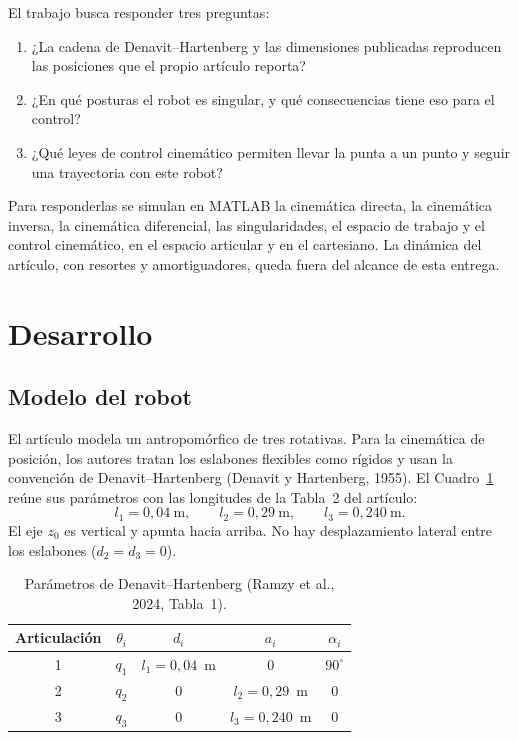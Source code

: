\documentclass[11pt,a4paper]{article}
\begin{document}
El trabajo busca responder tres preguntas:
\begin{enumerate}
\item ¿La cadena de Denavit--Hartenberg y las dimensiones publicadas reproducen las posiciones que el propio artículo reporta?
\item ¿En qué posturas el robot es singular, y qué consecuencias tiene eso para el control?
\item ¿Qué leyes de control cinemático permiten llevar la punta a un punto y seguir una trayectoria con este robot?
\end{enumerate}

Para responderlas se simulan en MATLAB la cinemática directa, la cinemática inversa, la cinemática diferencial, las singularidades, el espacio de trabajo y el control cinemático, en el espacio articular y en el cartesiano. La dinámica del artículo, con resortes y amortiguadores, queda fuera del alcance de esta entrega.

\section{Desarrollo}

\subsection{Modelo del robot}

El artículo modela un antropomórfico de tres rotativas. Para la cinemática de posición, los autores tratan los eslabones flexibles como rígidos y usan la convención de Denavit--Hartenberg (Denavit y Hartenberg, 1955). El Cuadro~\ref{tab:dh} reúne sus parámetros con las longitudes de la Tabla~2 del artículo:
\begin{equation}
l_1=0{,}04~\mathrm{m},\qquad l_2=0{,}29~\mathrm{m},\qquad l_3=0{,}240~\mathrm{m}.
\end{equation}
El eje \(z_0\) es vertical y apunta hacia arriba. No hay desplazamiento lateral entre los eslabones (\(d_2=d_3=0\)).

\begin{table}[ht]
\centering
\caption{Parámetros de Denavit--Hartenberg (Ramzy et al., 2024, Tabla~1).}
\label{tab:dh}
\begin{tabular}{@{}ccccc@{}}
\toprule
Articulación & \(\theta_i\) & \(d_i\) & \(a_i\) & \(\alpha_i\) \\
\midrule
1 & \(q_1\) & \(l_1=0{,}04\)~m & 0 & \(90^\circ\) \\
2 & \(q_2\) & 0 & \(l_2=0{,}29\)~m & 0 \\
3 & \(q_3\) & 0 & \(l_3=0{,}240\)~m & 0 \\
\bottomrule
\end{tabular}
\end{table}
\end{document}
